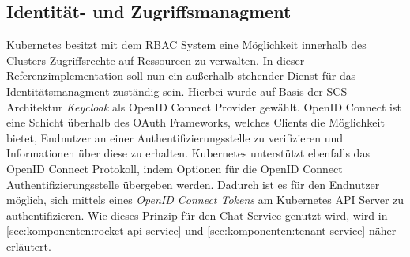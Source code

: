 \subsection{Identität- und Zugriffsmanagment}
Kubernetes besitzt mit dem \ac{RBAC} System eine Möglichkeit innerhalb des Clusters Zugriffsrechte auf Ressourcen
zu verwalten. In dieser Referenzimplementation soll nun ein außerhalb stehender Dienst für das Identitätsmanagment
zuständig sein. Hierbei wurde auf Basis der \ac{SCS} Architektur \emph{Keycloak} als OpenID Connect Provider gewählt.
OpenID Connect ist eine Schicht überhalb des OAuth Frameworks, welches Clients die Möglichkeit bietet, Endnutzer
an einer Authentifizierungsstelle zu verifizieren und Informationen über diese zu erhalten. \cite{OpenID2021}
Kubernetes unterstützt ebenfalls das OpenID Connect Protokoll, indem Optionen für die OpenID Connect Authentifizierungsstelle
übergeben werden. Dadurch ist es für den Endnutzer möglich, sich mittels eines \emph{OpenID Connect Tokens} am 
Kubernetes API Server zu authentifizieren. Wie dieses Prinzip für den Chat Service genutzt wird, wird 
in \ref{sec:komponenten:rocket-api-service} und \ref{sec:komponenten:tenant-service} näher erläutert.